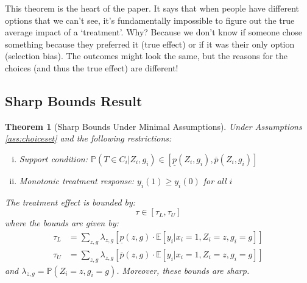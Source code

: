 \documentclass{article}
\newtheorem{theorem}{Theorem}
\newcommand{\E}{\mathbb{E}}
\renewcommand{\Pr}{\mathbb{P}}
\begin{document}
\begin{tcolorbox}[mycommentbox,title=why non-identification is a big deal]
This theorem is the heart of the paper. It says that when people have different options that we can't see, it's fundamentally impossible to figure out the true average impact of a `treatment'. Why? Because we don't know if someone chose something because they preferred it (true effect) or if it was their only option (selection bias). The outcomes might look the same, but the reasons for the choices (and thus the true effect) are different!
\end{tcolorbox}

\subsection{Sharp Bounds Result}

\begin{theorem}[Sharp Bounds Under Minimal Assumptions]
\label{thm:bounds}
Under Assumptions \ref{ass:choiceset} and the following restrictions:
\begin{enumerate}[(i)]
    \item \textit{Support condition:} $\Pr(T \in C_i | Z_i, g_i) \in [\underline{p}(Z_i, g_i), \overline{p}(Z_i, g_i)]$ %
    \item \textit{Monotonic treatment response:} $y_i(1) \geq y_i(0)$ for all $i$ %
\end{enumerate}
The treatment effect is bounded by:
\begin{equation}
\tau \in [\tau_L, \tau_U] %
\end{equation}
where the bounds are given by:
\begin{align}
\tau_L &= \sum_{z,g} \lambda_{z,g} \left[ \underline{p}(z,g) \cdot \E[y_i | x_i = 1, Z_i = z, g_i = g] \right] \\
\tau_U &= \sum_{z,g} \lambda_{z,g} \left[ \overline{p}(z,g) \cdot \E[y_i | x_i = 1, Z_i = z, g_i = g] \right]
\end{align}
and $\lambda_{z,g} = \Pr(Z_i = z, g_i = g)$. Moreover, these bounds are sharp.
\end{theorem}
\end{document}
